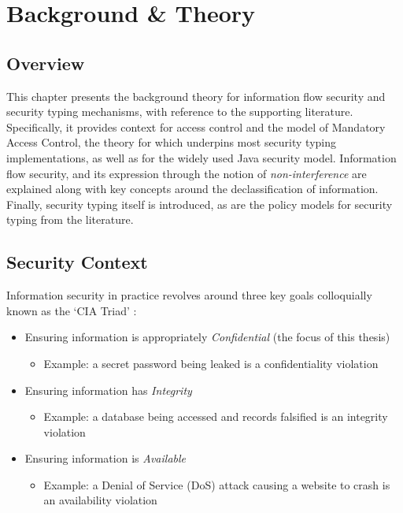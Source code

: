 \chapter{Background \& Theory} \label{chap_theory}

\section{Overview}

This chapter presents the background theory for information flow security and security typing mechanisms, with reference to the supporting literature. Specifically, it provides context for access control and the model of Mandatory Access Control, the theory for which underpins most security typing implementations, as well as for the widely used Java security model. Information flow security, and its expression through the notion of \textit{non-interference} are explained along with key concepts around the declassification of information. Finally, security typing itself is introduced, as are the policy models for security typing from the literature.

\newpage

\section{Security Context}

Information security in practice revolves around three key goals colloquially known as the `CIA Triad' \cite{krutz2010cloudsec}:

\begin{itemize}
	\item Ensuring information is appropriately \textit{Confidential} (the focus of this thesis)

	\begin{itemize}
		\item Example: a secret password being leaked is a confidentiality violation
	\end{itemize}
	
	\item Ensuring information has \textit{Integrity}
	
	\begin{itemize}
		\item Example: a database being accessed and records falsified is an integrity violation
	\end{itemize}
	
	\item Ensuring information is \textit{Available}
	
	\begin{itemize}
		\item Example: a Denial of Service (DoS) attack causing a website to crash is an availability violation
	\end{itemize}

\end{itemize}

